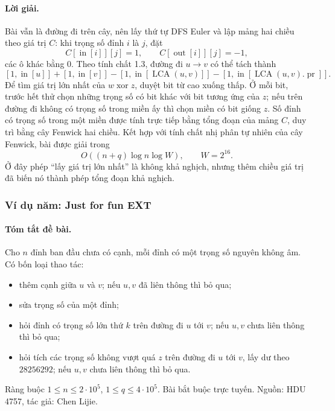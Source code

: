 \documentclass[11pt]{article}
\begin{document}
\paragraph{Lời giải.}
Bài vẫn là đường đi trên cây, nên lấy thứ tự DFS Euler và lập mảng hai chiều
theo giá trị \(C\): khi trọng số đỉnh \(i\) là \(j\), đặt
\[
  C[\operatorname{in}[i]][j]=1,\qquad
  C[\operatorname{out}[i]][j]=-1,
\]
các ô khác bằng \(0\). Theo tính chất 1.3, đường đi \(u\to v\) có thể tách
thành
\[
  [1,\operatorname{in}[u]]+[1,\operatorname{in}[v]]
  -[1,\operatorname{in}[\operatorname{LCA}(u,v)]]
  -[1,\operatorname{in}[\operatorname{LCA}(u,v).\operatorname{pr}]].
\]
Để tìm giá trị lớn nhất của \(w\operatorname{xor} z\), duyệt bit từ cao xuống
thấp. Ở mỗi bit, trước hết thử chọn những trọng số có bit khác với bit tương
ứng của \(z\); nếu trên đường đi không có trọng số trong miền ấy thì chọn miền
có bit giống \(z\). Số đỉnh có trọng số trong một miền được tính trực tiếp bằng
tổng đoạn của mảng \(C\), duy trì bằng cây Fenwick hai chiều. Kết hợp với tính
chất nhị phân tự nhiên của cây Fenwick, bài được giải trong
\[
  O((n+q)\log n\log W),\qquad W=2^{16}.
\]
Ở đây phép ``lấy giá trị lớn nhất'' là không khả nghịch, nhưng thêm chiều giá
trị đã biến nó thành phép tổng đoạn khả nghịch.

\subsubsection{Ví dụ năm: Just for fun EXT}

\paragraph{Tóm tắt đề bài.}
Cho \(n\) đỉnh ban đầu chưa có cạnh, mỗi đỉnh có một trọng số nguyên không âm.
Có bốn loại thao tác:
\begin{itemize}
  \item thêm cạnh giữa \(u\) và \(v\); nếu \(u,v\) đã liên thông thì bỏ qua;
  \item sửa trọng số của một đỉnh;
  \item hỏi đỉnh có trọng số lớn thứ \(k\) trên đường đi \(u\) tới \(v\); nếu
  \(u,v\) chưa liên thông thì bỏ qua;
  \item hỏi tích các trọng số không vượt quá \(z\) trên đường đi \(u\) tới
  \(v\), lấy dư theo \(28256292\); nếu \(u,v\) chưa liên thông thì bỏ qua.
\end{itemize}
Ràng buộc \(1\le n\le2\cdot10^5\), \(1\le q\le4\cdot10^5\). Bài bắt buộc
trực tuyến. Nguồn: HDU 4757, tác giả: Chen Lijie.
\end{document}
